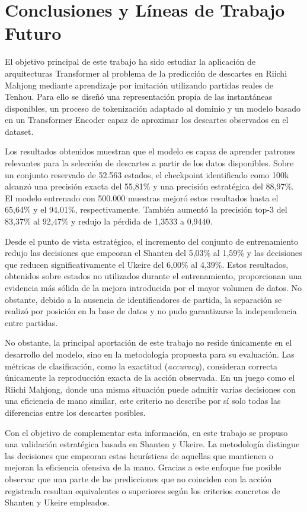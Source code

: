 \section{Conclusiones y Líneas de Trabajo Futuro}

El objetivo principal de este trabajo ha sido estudiar la aplicación de arquitecturas Transformer al problema de la predicción de descartes en Riichi Mahjong mediante aprendizaje por imitación utilizando partidas reales de Tenhou. Para ello se diseñó una representación propia de las instantáneas disponibles, un proceso de tokenización adaptado al dominio y un modelo basado en un Transformer Encoder capaz de aproximar los descartes observados en el dataset.

Los resultados obtenidos muestran que el modelo es capaz de aprender patrones relevantes para la selección de descartes a partir de los datos disponibles. Sobre un conjunto reservado de 52.563 estados, el checkpoint identificado como 100k alcanzó una precisión exacta del 55,81\% y una precisión estratégica del 88,97\%. El modelo entrenado con 500.000 muestras mejoró estos resultados hasta el 65,64\% y el 94,01\%, respectivamente. También aumentó la precisión top-3 del 83,37\% al 92,47\% y redujo la pérdida de 1,3533 a 0,9440.

Desde el punto de vista estratégico, el incremento del conjunto de entrenamiento redujo las decisiones que empeoran el Shanten del 5,03\% al 1,59\% y las decisiones que reducen significativamente el Ukeire del 6,00\% al 4,39\%. Estos resultados, obtenidos sobre estados no utilizados durante el entrenamiento, proporcionan una evidencia más sólida de la mejora introducida por el mayor volumen de datos. No obstante, debido a la ausencia de identificadores de partida, la separación se realizó por posición en la base de datos y no pudo garantizarse la independencia entre partidas.

No obstante, la principal aportación de este trabajo no reside únicamente en el desarrollo del modelo, sino en la metodología propuesta para su evaluación. Las métricas de clasificación, como la exactitud (\textit{accuracy}), consideran correcta únicamente la reproducción exacta de la acción observada. En un juego como el Riichi Mahjong, donde una misma situación puede admitir varias decisiones con una eficiencia de mano similar, este criterio no describe por sí solo todas las diferencias entre los descartes posibles.

Con el objetivo de complementar esta información, en este trabajo se propuso una validación estratégica basada en Shanten y Ukeire. La metodología distingue las decisiones que empeoran estas heurísticas de aquellas que mantienen o mejoran la eficiencia ofensiva de la mano. Gracias a este enfoque fue posible observar que una parte de las predicciones que no coinciden con la acción registrada resultan equivalentes o superiores según los criterios concretos de Shanten y Ukeire empleados.

